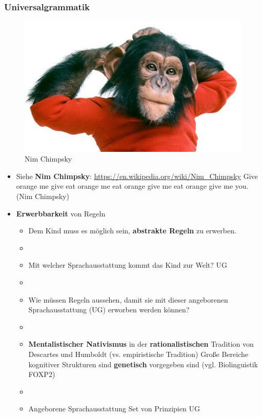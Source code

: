 \begin{frame}
\frametitle{Universalgrammatik}

\begin{figure}
\centering
	\includegraphics[scale=.26]{material/06nimchimpsky}
	\caption{Nim Chimpsky}
\end{figure}

\begin{itemize}
	\item Siehe \textbf{Nim Chimpsky}: \url{https://en.wikipedia.org/wiki/Nim_Chimpsky}
	\ea Give orange me give eat orange me eat orange give me eat orange give me you. \hfill (Nim Chimpsky)
	\z

\end{itemize}

\end{frame}


\begin{frame}

\begin{itemize}
	\item \textbf{Erwerbbarkeit} von Regeln 
	\begin{itemize}
		\item Dem Kind muss es möglich sein, \textbf{abstrakte Regeln} zu erwerben.
		\item[]
		\item Mit welcher Sprachausstattung kommt das Kind zur Welt? \ras UG
		\item[]
		\item Wie müssen Regeln aussehen, damit sie mit dieser angeborenen Sprachausstattung (UG) erworben werden können?
		\item[]
		\item \textbf{Mentalistischer Nativismus} in der \textbf{rationalistischen} Tradition von Descartes und Humboldt (vs. empiristische Tradition) \ras Große Bereiche kognitiver Strukturen sind \textbf{genetisch} vorgegeben sind (vgl. Biolinguistik \ras FOXP2) \citep[vgl.][]{Hornstein05a}
		\item[]
		\item Angeborene Sprachausstattung \ras Set von Prinzipien \ras UG		
	\end{itemize}
\end{itemize}

\end{frame}


